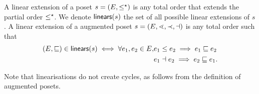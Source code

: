 
\begin{definition}
  \label{def:linears}
  A linear extension of a poset $s=(E,\leq^{\star})$ is any total order that extends the partial order $\leq^{\star}$. We denote $\mathsf{linears}(s)$ the set of all possible linear extensions of $s$. A linear extension of a augmented poset $s=(E,\lessdot,\prec,\dashv)$ is any total order such that
  \begin{align*}
    (E,\sqsubseteq)\in\mathsf{linears}(s) \iff \forall e_1,e_2\in E, &e_1\leq e_2\implies e_1\sqsubseteq e_2\\
    & e_1\dashv e_2\implies e_2\sqsubseteq e_1.
  \end{align*}
\end{definition}
Note that linearisations do not create cycles, as follows from the definition of augmented posets.

